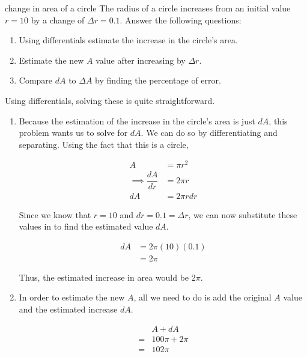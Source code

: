 \begin{examplebreak}{change in area of a circle}
    The radius of a circle increases from an initial value \( r = 10 \) by a change of \( \Delta r = 0.1 \). Answer the following questions:
    
    \begin{enumerate}
        \item Using differentials estimate the increase in the circle's area.
        \item Estimate the new \( A \) value after increasing by \( \Delta r \).
        \item Compare \( dA \) to \( \Delta A \) by finding the percentage of error.
    \end{enumerate}
    
    \vspace{0.3cm}
    
    Using differentials, solving these is quite straightforward.
    
    \begin{enumerate}
        \item Because the estimation of the increase in the circle's area is just \( dA \), this problem wants us to solve for \( dA \). We can do so by differentiating and separating. Using the fact that this is a circle,
        
        \begin{align*}
            A &= \pi r^2 \\
            \implies \dfrac{dA}{dr} &= 2 \pi r \\
            dA &= 2 \pi r dr
        \end{align*}
        
        Since we know that \( r = 10 \) and \( dr = 0.1 = \Delta r   \), we can now substitute these values in to find the estimated value \( dA \).
        
        \begin{align*}
            dA &= 2 \pi \left( 10 \right) \left( 0.1 \right) \\
            &= 2 \pi
        \end{align*}
        
        Thus, the estimated increase in area would be \( 2 \pi \).
        
        \item In order to estimate the new \( A \), all we need to do is add the original \( A \) value and the estimated increase \( dA \).
        
        \begin{align*}
            &A + dA \\
            = &100 \pi + 2 \pi \\
            = &102 \pi
        \end{align*}
        

\end{enumerate}
\end{examplebreak}
